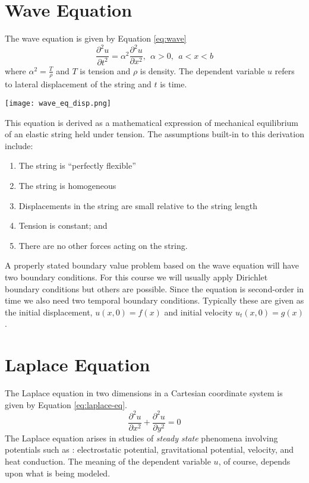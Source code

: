 \section{Wave Equation}

The wave equation is given by Equation \ref{eq:wave}
\begin{equation}
\frac{\partial^2 u}{\partial t^2} = \alpha^2 \frac{\partial^2 u}{\partial x^2}, \ \ \alpha>0, \ \ a<x<b
\label{eq:wave}
\end{equation}
where $\alpha^2 = \frac{T}{\rho}$ and $T$ is tension and $\rho$ is density.  The dependent variable $u$ refers to lateral displacement of the string and $t$ is time.
\begin{marginfigure}
\texttt{[image: wave\_eq\_disp.png]}
\end{marginfigure}

This equation is derived as a mathematical expression of mechanical equilibrium of an elastic string held under tension.  The assumptions built-in to this derivation include:
\begin{enumerate}
\item The string is ``perfectly flexible'' 
\item The string is homogeneous
\item Displacements in the string are small relative to the string length
\item Tension is constant; and
\item There are no other forces acting on the string.
\end{enumerate}
A properly stated boundary value problem based on the wave equation will have two boundary conditions.  For this course we will usually apply Dirichlet boundary conditions but others are possible.  Since the equation is second-order in time we also need two temporal boundary conditions.  Typically these are given as the initial displacement, $u(x,0)=f(x)$ and initial velocity $u_t(x,0)=g(x)$.

\section{Laplace Equation}
The Laplace equation in two dimensions in a Cartesian coordinate system is given by Equation \ref{eq:laplace-eq}.
\begin{equation}
\frac{\partial^2 u}{\partial x^2} + \frac{\partial^2 u}{\partial y^2} = 0
\label{eq:laplace-eq}
\end{equation}
The Laplace equation arises in studies of \emph{steady state} phenomena involving potentials such as : electrostatic potential, gravitational potential, velocity, and heat conduction.  The meaning of the dependent variable $u$, of course, depends upon what is being modeled.  

